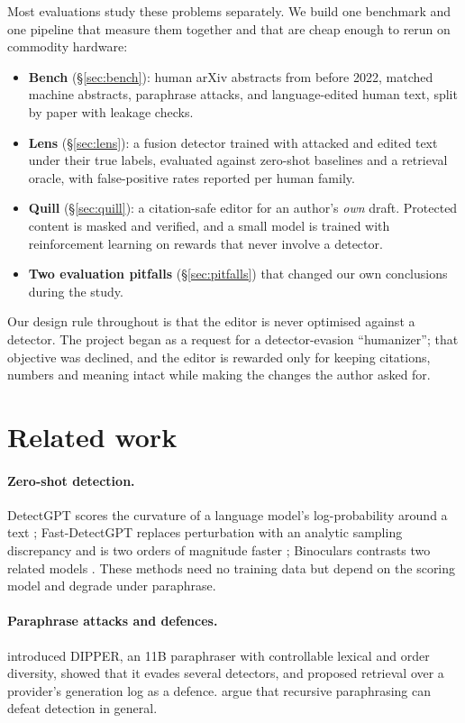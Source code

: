\documentclass[11pt]{article}
\begin{document}
Most evaluations study these problems separately.
We build one benchmark and one pipeline that measure them together and that are cheap enough to rerun on commodity hardware:

\begin{itemize}
  \item \textbf{Bench} (\S\ref{sec:bench}): human arXiv abstracts from before 2022, matched machine abstracts, paraphrase attacks, and language-edited human text, split by paper with leakage checks.
  \item \textbf{Lens} (\S\ref{sec:lens}): a fusion detector trained with attacked and edited text under their true labels, evaluated against zero-shot baselines and a retrieval oracle, with false-positive rates reported per human family.
  \item \textbf{Quill} (\S\ref{sec:quill}): a citation-safe editor for an author's \emph{own} draft. Protected content is masked and verified, and a small model is trained with reinforcement learning on rewards that never involve a detector.
  \item \textbf{Two evaluation pitfalls} (\S\ref{sec:pitfalls}) that changed our own conclusions during the study.
\end{itemize}

Our design rule throughout is that the editor is never optimised against a detector.
The project began as a request for a detector-evasion ``humanizer''; that objective was declined, and the editor is rewarded only for keeping citations, numbers and meaning intact while making the changes the author asked for.

\section{Related work}

\paragraph{Zero-shot detection.}
DetectGPT scores the curvature of a language model's log-probability around a text \citep{mitchell2023detectgpt}; Fast-DetectGPT replaces perturbation with an analytic sampling discrepancy and is two orders of magnitude faster \citep{bao2024fastdetectgpt}; Binoculars contrasts two related models \citep{hans2024binoculars}.
These methods need no training data but depend on the scoring model and degrade under paraphrase.

\paragraph{Paraphrase attacks and defences.}
\citet{krishna2023paraphrasing} introduced DIPPER, an 11B paraphraser with controllable lexical and order diversity, showed that it evades several detectors, and proposed retrieval over a provider's generation log as a defence.
\citet{sadasivan2023reliably} argue that recursive paraphrasing can defeat detection in general.
\end{document}
